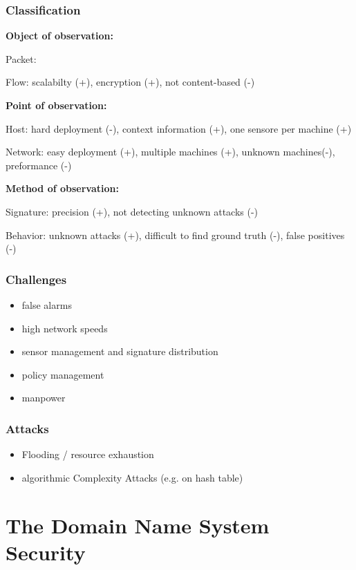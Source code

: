 \documentclass[fs, footer]{latex4ei}
\begin{document}
\begin{multicols*}{4}
{\subsubsection{Classification}
\textbf{Object of observation:}

Packet:

Flow: scalabilty (+), encryption (+), not content-based (-)

\textbf{Point of observation:}

Host: hard deployment (-), context information (+), one sensore per machine (+)

Network: easy deployment (+), multiple machines (+), unknown machines(-), preformance (-)

\textbf{Method of observation:}

Signature: precision (+), not detecting unknown attacks (-)

Behavior: unknown attacks (+), difficult to find ground truth (-), false positives (-)

\subsubsection{Challenges}
\begin{itemize}
 	\item false alarms
 	\item high network speeds
 	\item sensor management and signature distribution
 	\item policy management
 	\item manpower
 \end{itemize} 

 \subsubsection{Attacks}
 \begin{itemize}
 	\item Flooding / resource exhaustion
 	\item algorithmic Complexity Attacks (e.g. on hash table)

 \end{itemize}
}

\section{The Domain Name System Security}
\end{multicols*}
\end{document}
